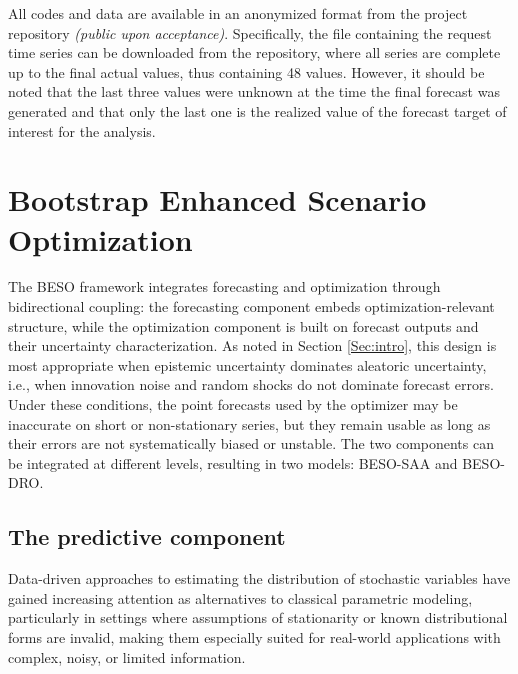 \documentclass[mnsc,sglanonrev]{informs4}  %
\theoremstyle{remark}\newtheorem{remark}{Remark}
\begin{document}
All codes and data are available in an anonymized format from the project repository 
{\it (public upon acceptance)}. Specifically, the file containing the request time series can be downloaded from the repository, where all series are complete up to the final actual values, thus containing 48 values. However, it should be noted that the last three values were unknown at the time the final forecast was generated and that only the last one is the realized value of the forecast target of interest for the analysis.



\section{Bootstrap Enhanced Scenario Optimization} \label{Sec:BESOtheory}

The BESO framework integrates forecasting and optimization through bidirectional coupling: the forecasting component embeds optimization-relevant structure, while the optimization component is built on forecast outputs and their uncertainty characterization. As noted in Section \ref{Sec:intro}, this design is most appropriate when epistemic uncertainty dominates aleatoric uncertainty, i.e., when innovation noise and random shocks do not dominate forecast errors. Under these conditions, the point forecasts used by the optimizer may be inaccurate on short or non-stationary series, but they remain usable as long as their errors are not systematically biased or unstable. 
The two components can be integrated at different levels, resulting in two models: BESO-SAA and BESO-DRO.

\subsection{The predictive component} \label{Subsec:predictive}

Data-driven approaches to estimating the distribution of stochastic variables have gained increasing attention as alternatives to classical parametric modeling, particularly in settings where assumptions of stationarity or known distributional forms are invalid, making them especially suited for real-world applications with complex, noisy, or limited information.
\end{document}
